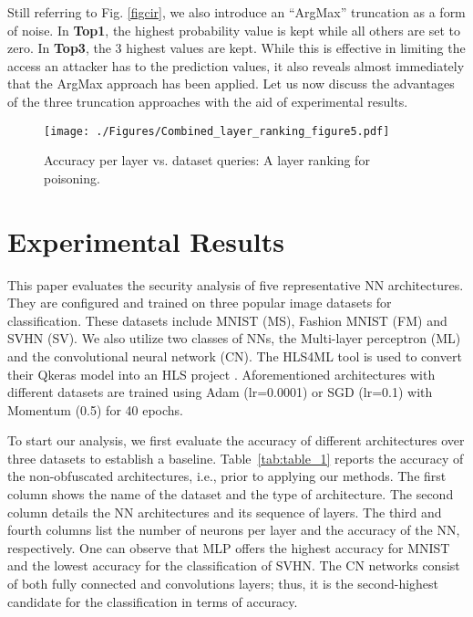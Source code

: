 \documentclass[10pt, twocolumn, conference]{IEEEtran}
\begin{document}
Still referring to Fig. \ref{figcir}, we also introduce an ``ArgMax'' truncation as a form of noise. In \textbf{Top1}, the highest probability value is kept while all others are set to zero. In \textbf{Top3}, the 3 highest values are kept. While this is effective in limiting the access an attacker has to the prediction values, it also reveals almost immediately that the ArgMax approach has been applied. Let us now discuss the advantages of the three truncation approaches with the aid of experimental results.


\begin{figure*}[t]
\centering
{\texttt{[image: ./Figures/Combined\_layer\_ranking\_figure5.pdf]}}\vspace{-10pt}
\caption{Accuracy per layer vs. dataset queries: A layer ranking for poisoning.}\vspace{-10pt}
\label{figspag}
\end{figure*}

\section{Experimental Results} \label{sec:results}
This paper evaluates the security analysis of five representative NN architectures. They are configured and trained on three popular image datasets for classification. These datasets include MNIST (MS), Fashion MNIST (FM) and SVHN (SV). We also utilize two classes of NNs, the Multi-layer perceptron (ML) and the convolutional neural network (CN). The HLS4ML tool is used to convert their Qkeras model into an HLS project \cite{rfhls4ml}. Aforementioned architectures with different datasets are trained using Adam (lr=0.0001) or SGD (lr=0.1) with Momentum (0.5) for 40 epochs. 

To start our analysis, we first evaluate the accuracy of different architectures over three datasets to establish a baseline. Table~\ref{tab:table_1} reports the accuracy of the non-obfuscated architectures, i.e., prior to applying our methods. The first column shows the name of the dataset and the type of architecture. The second column details the NN architectures and its sequence of layers. The third and fourth columns list the number of neurons per layer and the accuracy of the NN, respectively. One can observe that MLP offers the highest accuracy for MNIST and the lowest accuracy for the classification of SVHN. The CN networks consist of both fully connected and convolutions layers; thus, it is the second-highest candidate for the classification in terms of accuracy. 
\end{document}
